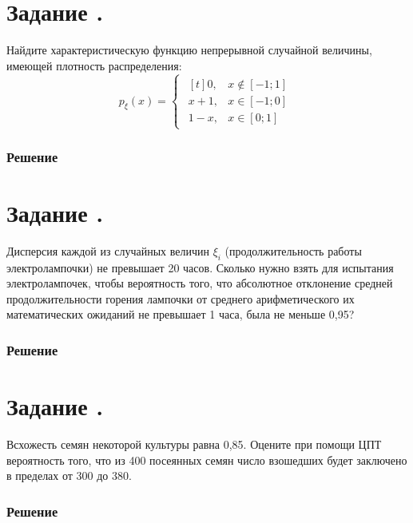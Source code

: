 \documentclass[12pt]{article}
\begin{document}
\section*{Задание .}

Найдите характеристическую функцию непрерывной случайной величины, имеющей плотность распределения:
\begin{equation*}
	p_{\xi}(x) =
	\begin{cases}
		\begin{aligned}[t]
			0,     & x \notin [-1; 1] \\
			x + 1, & x \in [-1; 0]    \\
			1 - x, & x \in [0; 1]
		\end{aligned}
	\end{cases}
\end{equation*}
\subsubsection*{Решение}

\section*{Задание .}

Дисперсия каждой из случайных величин $\xi_i$ (продолжительность работы электролампочки)
не превышает 20 часов.
Сколько нужно взять для испытания электролампочек, чтобы вероятность того,
что абсолютное отклонение средней продолжительности горения лампочки
от среднего арифметического их математических ожиданий не превышает 1 часа,
была не меньше 0,95?
\subsubsection*{Решение}

\section*{Задание .}

Всхожесть семян некоторой культуры равна 0,85. Оцените при помощи ЦПТ вероятность того, что
из 400 посеянных семян число взошедших будет заключено в пределах от 300 до 380.

\subsubsection*{Решение}
\end{document}
